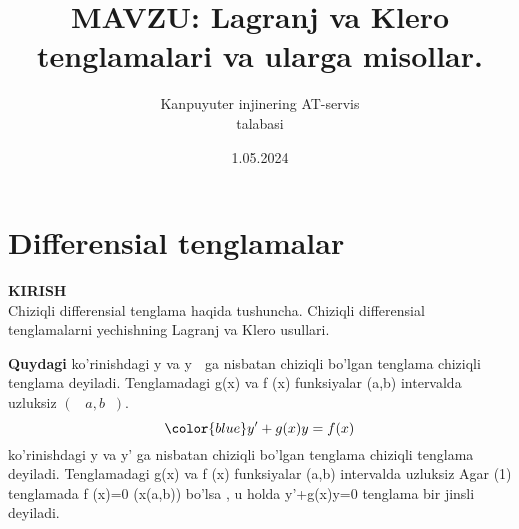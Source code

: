 \documentclass{beamer}
\begin{document}
\title[DIFFERENSIAL TENGLAMALAR]{MAVZU: Lagranj va Klero tenglamalari va ularga misollar.}
\author[Aliyev Abdulvosid]{Kanpuyuter injinering AT-servis\\talabasi}
\date[Math Project Presentation]{1.05.2024}


\begin{frame}
\titlepage %
\end{frame}


\section{Differensial tenglamalar} %

\begin{frame}
\begin{center}
\color{red}
  \textbf{KIRISH}
  \\Chiziqli differensial tenglama haqida tushuncha.
Chiziqli differensial tenglamalarni yechishning Lagranj va Klero usullari.
\\
\end{center} 
\textbf{Quydagi} 
ko’rinishdagi y va y  ga nisbatan chiziqli bo’lgan tenglama chiziqli tenglama deyiladi. Tenglamadagi g(x) va f (x) funksiyalar (a,b) intervalda uzluksiz
$ ( a, b).$
\\
\begin{equation}
\color{blue}    y'+g(x)y=f(x)
   \end{equation}
\quad ko’rinishdagi y va y' ga nisbatan chiziqli bo’lgan tenglama chiziqli tenglama deyiladi. Tenglamadagi g(x) va f (x) funksiyalar (a,b) intervalda uzluksiz Agar (1) tenglamada f (x)=0 (x\in(a,b)) bo’lsa , u holda y'+g(x)y=0
 tenglama bir jinsli deyiladi.\\
\end{frame}
\end{document}
